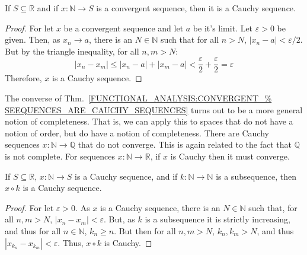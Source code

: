 \documentclass[crop=false,class=book,oneside]{standalone}
\begin{document}
            \begin{theorem}
                \label{FUNCTIONAL_ANALYSIS:CONVERGENT_%
                       SEEQUENCES_ARE_CAUCHY_SEQUENCES}
                If $S\subseteq\mathbb{R}$ and if
                $x:\mathbb{N}\rightarrow{S}$
                is a convergent sequence, then it
                is a Cauchy sequence.
            \end{theorem}
            \begin{proof}
                For let $x$ be a convergent sequence and
                let $a$ be it's limit.
                Let $\varepsilon>0$ be given. Then, as
                $x_{n}\rightarrow{a}$, there is an
                $N\in\mathbb{N}$ such that for all $n>N$,
                $|x_{n}-a|<\varepsilon/2$.
                But by the triangle inequality,
                for all $n,m>N$:
                \begin{equation}
                    |x_{n}-x_{m}|\leq
                    |x_{n}-a|+|x_{m}-a|<
                    \frac{\varepsilon}{2}+
                    \frac{\varepsilon}{2}
                    =\varepsilon
                \end{equation}
                Therefore, $x$ is a Cauchy sequence.
            \end{proof}
            The converse of
            Thm.~\ref{FUNCTIONAL_ANALYSIS:CONVERGENT_%
                      SEEQUENCES_ARE_CAUCHY_SEQUENCES}
            turns out to be a more general notion
            of completeness. That is, we can apply
            this to spaces that do not have
            a notion of order, but do have a notion
            of completeness. There are Cauchy sequences
            $x:\mathbb{N}\rightarrow\mathbb{Q}$ that do
            not converge. This is again related to the fact
            that $\mathbb{Q}$ is not complete. For sequences
            $x:\mathbb{N}\rightarrow\mathbb{R}$,
            if $x$ is Cauchy then it must converge.
            \begin{theorem}
                \label{THM:FUNCTIONAL_ANALYSIS:%
                       SUBSEQ_OF_CAUCHY_IS_CAUCHY}
                If $S\subseteq\mathbb{R}$,
                $x:\mathbb{N}\rightarrow{S}$ is a Cauchy sequence,
                and if $k:\mathbb{N}\rightarrow\mathbb{N}$
                is a subsequence, then
                $x\circ{k}$ is a Cauchy sequence.
            \end{theorem}
            \begin{proof}
                For let $\varepsilon>0$. As $x$ is a Cauchy
                sequence, there is an $N\in\mathbb{N}$ such that,
                for all $n,m>N$, $|x_{n}-x_{m}|<\varepsilon$.
                But, as $k$ is a subsequence it is strictly
                increasing, and thus for all $n\in\mathbb{N}$,
                $k_{n}\geq{n}$. But then for all $n,m>N$,
                $k_{n},k_{m}>N$, and thus
                $|x_{k_{n}}-x_{k_{m}}|<\varepsilon$. Thus,
                $x\circ{k}$ is Cauchy.
            \end{proof}
\end{document}

